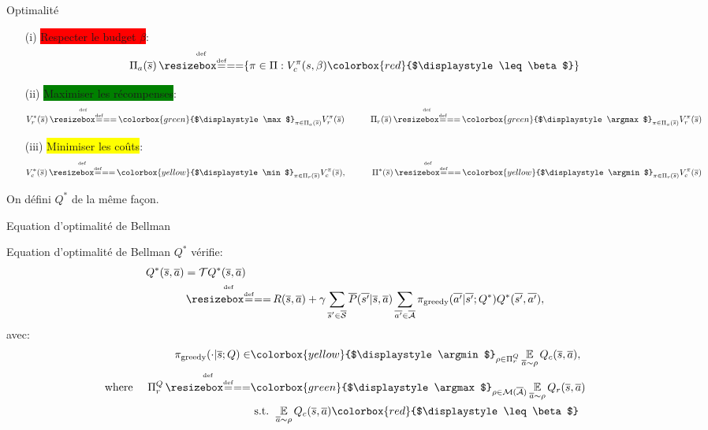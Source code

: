 \documentclass[french,handout]{beamer}
\newcommand{\mathcolorbox}[2]{\colorbox{#1}{$\displaystyle #2$}}
\begin{document}
    \begin{frame}{Optimalité}
        \begin{definition}
            \begin{enumerate}
                \item[(i)] \pause\colorbox{red}{Respecter le budget $\beta$}:
                \begin{equation*}
                    \Pi_a(\os) \eqdef \{\pi\in\Pi: V_c^\pi(s, \beta) \mathcolorbox{red}{\leq \beta}\}
                \end{equation*}
                \item[(ii)] \pause\colorbox{green}{Maximiser les récompenses}:
                \begin{equation*}
                    V_r^*(\os) \eqdef \mathcolorbox{green}{\max}_{\pi\in\Pi_a(\os)}  V_r^\pi(\os) \qquad\quad \Pi_r(\os) \eqdef \mathcolorbox{green}{\argmax}_{\pi\in\Pi_a(\os)}  V_r^\pi(\os)
                \end{equation*}
                \item[(iii)] \pause\colorbox{yellow}{Minimiser les coûts}:
                \begin{equation*}
                    V_c^*(\os) \eqdef \mathcolorbox{yellow}{\min}_{\pi\in\Pi_r(\os)}  V_c^\pi(\os), \qquad\quad \Pi^*(\os) \eqdef \mathcolorbox{yellow}{\argmin}_{\pi\in\Pi_r(\os)}  V_c^\pi(\os)
                \end{equation*}
            \end{enumerate}

            \pause On défini $Q^*$ de la même façon.
        \end{definition}
    \end{frame}

    \begin{frame}{Equation d'optimalité de Bellman}
        \begin{block}{Equation d'optimalité de Bellman}
            $Q^*$ vérifie:
            \begin{align*}
                Q^{*}(\os, \oa) &= \cT Q^{*}(\os, \oa)\\
                &\eqdef R(\os, \oa) + \gamma \sum_{\os'\in\ocS} \ov{P}(\ov{s'} | \os, \oa)\sum_{\ov{a'}\in \ocA} \pi_\text{greedy}(\ov{a'}|\ov{s'}; Q^*) Q^{*}(\ov{s'}, \ov{a'}),
            \end{align*}
            avec:
            \begin{align*}
                \pi_\text{greedy}(\cdot|\os; Q) \in &\mathcolorbox{yellow}{\argmin}_{\rho\in\Pi_r^Q} \expectedvalueover{\oa\sim\rho}Q_c(\os, \oa), \\
                \text{where }\quad \Pi_r^Q \eqdef &\mathcolorbox{green}{\argmax}_{\rho\in\cM(\ocA)} \expectedvalueover{\oa\sim\rho} Q_r(\os, \oa) \\
                & \text{ s.t. }  \expectedvalueover{\oa\sim\rho} Q_c(\os, \oa) \mathcolorbox{red}{\leq \beta}
            \end{align*}
        \end{block}
    \end{frame}
\end{document}
